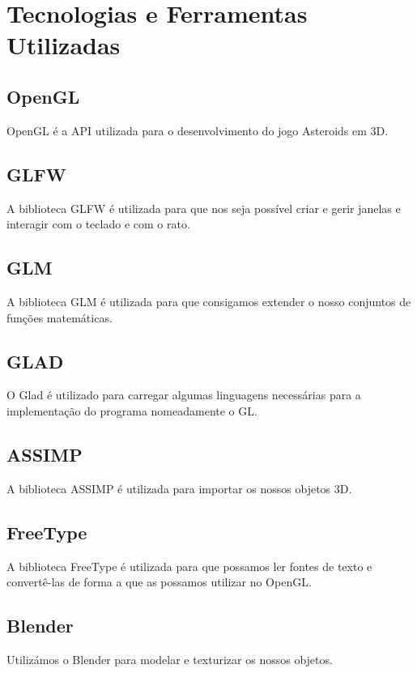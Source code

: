 \chapter{Tecnologias e Ferramentas Utilizadas}
\label{chap:tecno-ferra}

\section{OpenGL}
\label{chap2:sec:opengl}
OpenGL é a API utilizada para o desenvolvimento do jogo Asteroids em 3D.

\section{GLFW}
\label{chap2:sec:glfw}
A biblioteca GLFW é utilizada para que nos seja possível criar e gerir janelas e interagir com o teclado e com o rato. 

\section{GLM}
\label{chap2:sec:glm}
A biblioteca GLM é utilizada para que consigamos extender o nosso conjuntos de funções matemáticas. 

\section{GLAD}
\label{chap2:sec:glad}
O Glad é utilizado para carregar algumas linguagens necessárias para a implementação do programa nomeadamente o GL.

\section{ASSIMP}
\label{chap2:sec:assimp}
A biblioteca ASSIMP é utilizada para importar os nossos objetos 3D.

\section{FreeType}
\label{chap2:sec:freetype}
A biblioteca FreeType é utilizada para que possamos ler fontes de texto e convertê-las de forma a que as possamos utilizar no OpenGL.

\section{Blender}
\label{chap2:sec:blender}
Utilizámos o Blender para modelar e texturizar os nossos objetos.